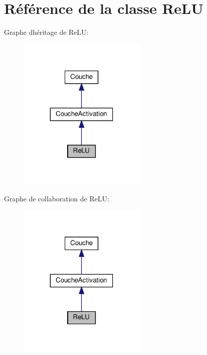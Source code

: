 \hypertarget{classReLU}{}\section{Référence de la classe Re\+LU}
\label{classReLU}


Graphe d\textquotesingle{}héritage de Re\+LU\+:
\nopagebreak
\begin{figure}[H]
\begin{center}
\leavevmode
\includegraphics[width=174pt]{classReLU__inherit__graph}
\end{center}
\end{figure}


Graphe de collaboration de Re\+LU\+:
\nopagebreak
\begin{figure}[H]
\begin{center}
\leavevmode
\includegraphics[width=174pt]{classReLU__coll__graph}
\end{center}
\end{figure}
